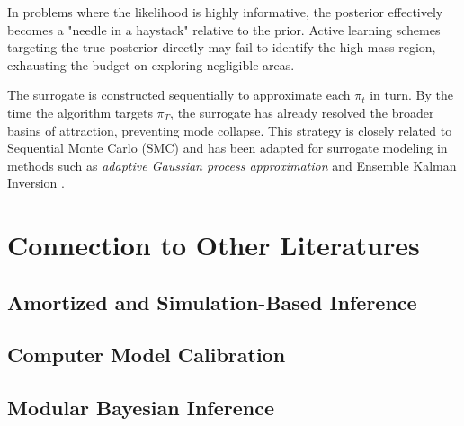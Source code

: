 \documentclass[12pt]{article}
\begin{document}
\citep{wang2018adaptive,adaptiveMultimodal} 


In problems where the likelihood is highly informative, the posterior effectively becomes a "needle in a haystack" relative to the prior. Active learning schemes targeting the true posterior directly may fail to identify the high-mass region, exhausting the budget on exploring negligible areas.

The surrogate is constructed sequentially to approximate each $\pi_t$ in turn. By the time the algorithm targets $\pi_T$, the surrogate has already resolved the broader basins of attraction, preventing mode collapse. This strategy is closely related to Sequential Monte Carlo (SMC) and has been adapted for surrogate modeling in methods such as \textit{adaptive Gaussian process approximation} \citep{wang2018adaptive, adaptiveMultimodal} and Ensemble Kalman Inversion \citep{EKI_review}.

\section{Connection to Other Literatures} \label{sec:connections}
\subsection{Amortized and Simulation-Based Inference} \label{sec:sbi}
\subsection{Computer Model Calibration}
\subsection{Modular Bayesian Inference}
\end{document}
